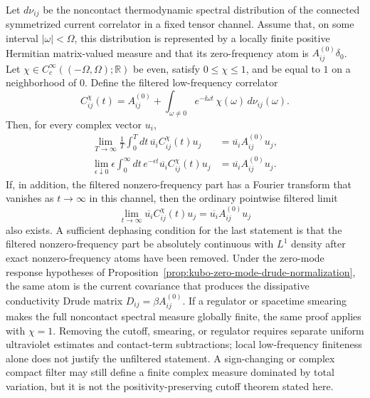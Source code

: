 \begin{proposition}
\label{prop:kubo-drude-time-domain-equivalences}
Let \(d\nu_{ij}\) be the noncontact thermodynamic spectral distribution of the
connected symmetrized current correlator in a fixed tensor channel.  Assume
that, on some interval \(|\omega|<\Omega\), this distribution is represented
by a locally finite positive Hermitian matrix-valued measure and that its
zero-frequency atom is \(A^{(0)}_{ij}\delta_0\).  Let
\(\chi\in C_c^\infty((-\Omega,\Omega);\mathbb R)\) be even, satisfy
\(0\leq\chi\leq1\), and be equal to \(1\) on a neighborhood of \(0\).
Define the filtered low-frequency correlator
\[
  C^\chi_{ij}(t)
  =
  A^{(0)}_{ij}
  +
  \int_{\omega\ne0}e^{-\ii\omega t}\,\chi(\omega)\,d\nu_{ij}(\omega).
\]
Then, for every complex vector \(u_i\),
\begin{align}
  \lim_{T\to\infty}\frac1T\int_0^Tdt\,
  \overline{u_i}C^\chi_{ij}(t)u_j
  &=
  \overline{u_i}A^{(0)}_{ij}u_j,
  \label{eq:kubo-cesaro-drude-atom}\\
  \lim_{\epsilon\downarrow0}
  \epsilon\int_0^\infty dt\,e^{-\epsilon t}
  \overline{u_i}C^\chi_{ij}(t)u_j
  &=
  \overline{u_i}A^{(0)}_{ij}u_j .
  \label{eq:kubo-abel-drude-atom}
\end{align}
If, in addition, the filtered nonzero-frequency part has a Fourier transform
that vanishes as \(t\to\infty\) in this channel, then the ordinary pointwise
filtered limit
\[
  \lim_{t\to\infty}\overline{u_i}C^\chi_{ij}(t)u_j
  =
  \overline{u_i}A^{(0)}_{ij}u_j
\]
also exists.  A sufficient dephasing condition for the last statement is that
the filtered nonzero-frequency part be absolutely continuous with \(L^1\)
density after exact nonzero-frequency atoms have been removed.  Under the
zero-mode response hypotheses of
Proposition~\ref{prop:kubo-zero-mode-drude-normalization}, the same atom is
the current covariance that produces the dissipative conductivity Drude matrix
\(D_{ij}=\beta A^{(0)}_{ij}\).
If a regulator or spacetime smearing makes the full noncontact spectral
measure globally finite, the same proof applies with \(\chi=1\).  Removing
the cutoff, smearing, or regulator requires separate uniform ultraviolet
estimates and contact-term subtractions; local low-frequency finiteness alone
does not justify the unfiltered statement.  A sign-changing or complex
compact filter may still define a finite complex measure dominated by total
variation, but it is not the positivity-preserving cutoff theorem stated here.
\end{proposition}

